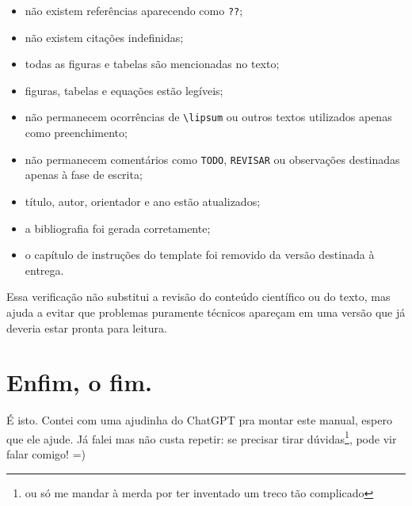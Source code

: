 \begin{itemize}
  \item não existem referências aparecendo como \verb|??|;
  \item não existem citações indefinidas;
  \item todas as figuras e tabelas são mencionadas no texto;
  \item figuras, tabelas e equações estão legíveis;
  \item não permanecem ocorrências de \verb|\lipsum| ou outros textos
        utilizados apenas como preenchimento;
  \item não permanecem comentários como \verb|TODO|, \verb|REVISAR| ou
        observações destinadas apenas à fase de escrita;
  \item título, autor, orientador e ano estão atualizados;
  \item a bibliografia foi gerada corretamente;
  \item o capítulo de instruções do template foi removido da versão
        destinada à entrega.
\end{itemize}

Essa verificação não substitui a revisão do conteúdo científico ou do texto, mas ajuda a evitar que problemas puramente técnicos apareçam em uma versão que já deveria estar pronta para leitura.

\section{Enfim, o fim.}

É isto. Contei com uma ajudinha do ChatGPT pra montar este manual, espero que ele ajude. Já falei mas não custa repetir: se precisar tirar dúvidas\footnote{ou só me mandar à merda por ter inventado um treco tão complicado}, pode vir falar comigo! =)

